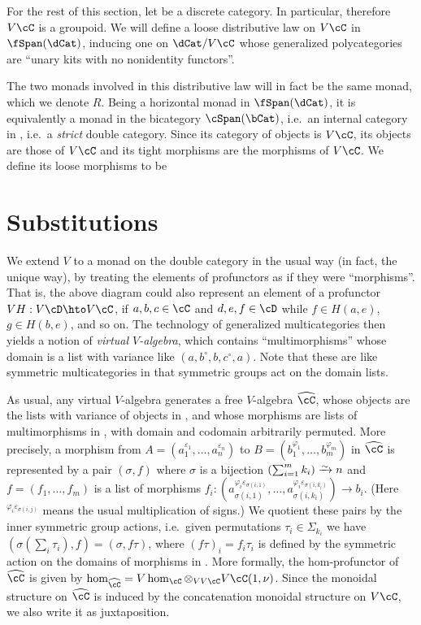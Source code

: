 \documentclass{amsart}
\newcommand{\C}{\cC}
\newcommand{\D}{\cD}
\renewcommand{\Chat}{\ensuremath{\widehat{\C}}\xspace}
\newcommand{\Tmult}{\nu}
\renewcommand{\o}{^{\circ}}
\newcommand{\e}[1][]{^{\varepsilon_{#1}}}
\renewcommand{\ph}[1][]{^{\varphi_{#1}}}
\newcommand{\phe}[2]{^{\varphi_{#1}\varepsilon_{#2}}}
\begin{document}
For the rest of this section, let \C be a discrete category.
In particular, therefore $V\C$ is a groupoid.
We will define a loose distributive law on $V\C$ in $\fSpan(\dCat)$, inducing one on $\dCat/V\C$ whose generalized polycategories are ``unary kits with no nonidentity functors''.

The two monads involved in this distributive law will in fact be the same monad, which we denote $R$.
Being a horizontal monad in $\fSpan(\dCat)$, it is equivalently a monad in the bicategory $\cSpan(\bCat)$, i.e.\ an internal category in \bCat, i.e.\ a \emph{strict} double category.
Since its category of objects is $V\C$, its objects are those of $V\C$ and its tight morphisms are the morphisms of $V\C$.
We define its loose morphisms to be



\section{Substitutions}
\label{sec:substitutions}

We extend $V$ to a monad on the double category \dCat in the usual way (in fact, the unique way), by treating the elements of profunctors as if they were ``morphisms''.
That is, the above diagram could also represent an element of a profunctor $V H : V \D \hto V \C$, if $a,b,c\in\C$ and $d,e,f\in \D$ while $f\in H(a,e)$, $g\in H(b,e)$, and so on.
The technology of generalized multicategories then yields a notion of \emph{virtual $V$-algebra}, which contains ``multimorphisms'' whose domain is a list with variance like $(a,b\o,b,c\o,a)$.
Note that these are like symmetric multicategories in that symmetric groups act on the domain lists.

As usual, any virtual $V$-algebra \C generates a free $V$-algebra \Chat, whose objects are the lists with variance of objects in \C, and whose morphisms are lists of multimorphisms in \C, with domain and codomain arbitrarily permuted.
More precisely, a morphism from $A=(a_1\e[1],\dots,a_n\e[n])$ to $B=(b_1\ph[1],\dots,b_m\ph[m])$ in \Chat is represented by a pair $(\sigma,f)$ where $\sigma$ is a bijection $\left(\sum_{i=1}^m k_i\right) \toiso n$ and $f=(f_1,\dots,f_m)$ is a list of morphisms $f_i:(a_{\sigma(i,1)}\phe{i}{\sigma(i,1)},\dots,a_{\sigma(i,k_i)}\phe{i}{\sigma(i,k_i)}) \to b_i$.
(Here $\phe{i}{\sigma(i,j)}$ means the usual multiplication of signs.)
We quotient these pairs by the inner symmetric group actions, i.e.\ given permutations $\tau_i\in\Sigma_{k_i}$ we have $(\sigma(\sum_i \tau_i), f) = (\sigma,f\tau)$, where $(f\tau)_i = f_i \tau_i$ is defined by the symmetric action on the domains of morphisms in \C.
More formally, the hom-profunctor of \Chat is given by $\hom_{\Chat} = V\hom_\C \otimes_{VV\C} V\C(1,\Tmult)$.
Since the monoidal structure on \Chat is induced by the concatenation monoidal structure on $V\C$, we also write it as juxtaposition.
\end{document}
